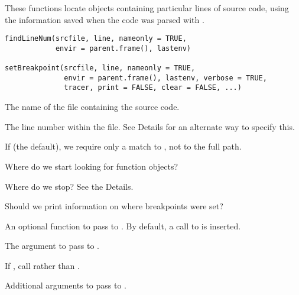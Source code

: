 %
\begin{Description}\relax
These functions locate objects containing particular lines of source
code, using the information saved when the code was parsed with
.
\end{Description}
%
\begin{Usage}
\begin{verbatim}
findLineNum(srcfile, line, nameonly = TRUE,
            envir = parent.frame(), lastenv)

setBreakpoint(srcfile, line, nameonly = TRUE,
              envir = parent.frame(), lastenv, verbose = TRUE,
              tracer, print = FALSE, clear = FALSE, ...)
\end{verbatim}
\end{Usage}
%
\begin{Arguments}
\begin{ldescription}
\item[\code{srcfile}] The name of the file containing the source code.
\item[\code{line}] The line number within the file.  See Details for an
alternate way to specify this.
\item[\code{nameonly}] If  (the default), we require only a match
to , not to the full path.
\item[\code{envir}] Where do we start looking for function objects?
\item[\code{lastenv}] Where do we stop?  See the Details.
\item[\code{verbose}] Should we print information on where breakpoints were set?
\item[\code{tracer}] An optional  function to pass to
.  By default, a call to 
is inserted.
\item[\code{print}] The  argument to pass to .
\item[\code{clear}] If , call  rather than 
.
\item[\code{...}] Additional arguments to pass to .
\end{ldescription}
\end{Arguments}
%
